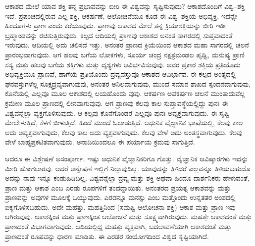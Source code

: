 ಆಕಾಶದ ಮೇಲೆ ಯಾವ ಶಕ್ತಿ ತನ್ನ ಪ್ರಭಾವವನ್ನು ಬೀರಿ ಈ ವಿಶ್ವವನ್ನು ಸೃಷ್ಟಿಸುವುದು? ಆಕಾಶದೊಂದಿಗೆ ವಿಶ್ವ–ಶಕ್ತಿ ಇದೆ. ಪ್ರಪಂಚದಲ್ಲಿರುವ ಎಲ್ಲ ಶಕ್ತಿ, ಆಕರ್ಷಣೆ, ಆಲೋಚನೆಯೂ ಕೂಡ ಈ ವಿಶ್ವ–ಶಕ್ತಿಯ ಅಭಿವ್ಯಕ್ತಿ. ಇದನ್ನೇ ಹಿಂದೂಗಳು ಪ್ರಾಣ ಎಂದು ಕರೆಯುವುದು. ಪ್ರಾಣವು ಆಕಾಶದ ಮೇಲೆ ತನ್ನ ಕ್ರಿಯಾಶಕ್ತಿಯನ್ನು ಬೀರಿ ಇಡೀ ಬ್ರಹ್ಮಾಂಡವನ್ನು ರಚಿಸುತ್ತಿರುವುದು. ಕಲ್ಪದ ಆದಿಯಲ್ಲಿ ಪ್ರಾಣವು ಆಕಾಶದ ಅನಂತ ಸಾಗರದಲ್ಲಿ ಸುಪ್ತವಾದಂತೆ ಇರುವುದು. ಆದಿಯಲ್ಲಿ ಅದು ಚಲಿಸದೆ ಇತ್ತು. ಅನಂತರ ಪ್ರಾಣದ ಕ್ರಿಯೆಯಿಂದ ಆಕಾಶದ ಮಹಾ ಸಾಗರದಲ್ಲಿ ಚಲನೆ ಪ್ರಾರಂಭವಾಗುವುದು. ಆಗ ಹಲವು ಬಗೆಯ ಲೋಕಗಳು, ಸೂರ್ಯ ಚಂದ್ರ ನಕ್ಷತ್ರಮಂಡಲ ಪೃಥ್ವಿ, ಮನುಷ್ಯ ಪ್ರಾಣಿ ಸಸ್ಯ ಮತ್ತು ಹಲವು ಬಗೆಯ ಶಕ್ತಿಗಳು ಮತ್ತು ದೃಶ್ಯಗಳು ಆವಿರ್ಭವಿಸುವುವು. ಅವರ ಪ್ರಕಾರ ಶಕ್ತಿಯ ಪ್ರತಿಯೊದು ಅಭಿವ್ಯಕ್ತಿಯೂ ಪ್ರಾಣವೆ, ಹಾಗೆಯೆ ಪ್ರತಿಯೊಂದು ದ್ರವ್ಯವಸ್ತುವೂ ಆಕಾಶದ ಆವಿರ್ಭಾವ. ಈ ಕಲ್ಪದ ಅಂತ್ಯದಲ್ಲಿ ಘನವಸ್ತುಗಳೆಲ್ಲ ಸೂಕ್ಷ್ಮದ್ರವ್ಯವಾಗುವುವು, ಅನಂತರ ಅನಿಲವಾಗುವುವು, ಮುಂದೆ ಸಮಾನ ಶಾಖದ ಸ್ಪಂದನವಾಗುವುವು, ಕೊನೆಯಲ್ಲಿ ಎಲ್ಲವೂ ಮೂಲ ಆಕಾಶದಲ್ಲಿ ಲಯಹೊಂದು ವುವು. ಆಕರ್ಷಣ ಅಪಕರ್ಷಣ ಚಲನೆ ಮುಂತಾದುವೆಲ್ಲ ಕ್ರಮೇಣ ಮೂಲ ಪ್ರಾಣದಲ್ಲಿ ಲೀನವಾಗುವುವು. ಆಗ ಪ್ರಾಣವು ಕೆಲವು ಕಾಲ ಸುಪ್ತಾವಸ್ಥೆಯಲ್ಲಿದ್ದು ಪುನಃ ಈ ವಿಶ್ವವನ್ನೆಲ್ಲಾ ವ್ಯಕ್ತಗೊಳಿಸುವುದು. ಆ ಕಲ್ಪವು ಕೊನೆಗೊಂಡರೆ ಎಲ್ಲವೂ ಪುನಃ ಅವ್ಯಕ್ತವಾಗುವುದು. ಈ ಸೃಷ್ಟಿ ಮೇಲೇಳುತ್ತಿದೆ, ಕೆಳಗೆ ಬೀಳುತ್ತಿದೆ. ಹಿಂದೆ ಮುಂದೆ ಓಲಾಡುತ್ತಿದೆ. ಆಧುನಿಕ ವೈಜ್ಞಾನಿಕ ಭಾಷೆಯಲ್ಲಿ, ಕೆಲವು ಕಾಲ ಅದು ಅವ್ಯಕ್ತವಾಗುವುದು, ಕೆಲವು ಕಾಲ ಅದು ವ್ಯಕ್ತವಾಗುವುದು. ಕೆಲವು ವೇಳೆ ಅದು ಅಂತಸ್ಥವಾಗುವುದು. ಕೆಲವು ವೇಳೆ ಬಾಹ್ಯಪ್ರಕಟಿತವಾಗುವುದು. ಅನಾದಿಯಿಂದಲೂ ಈ ಪರ್ಯಾಯ ಕ್ರಮವು ಸಾಗುತ್ತಿದೆ.

ಆದರೂ ಈ ವಿಶ್ಲೇಷಣೆ ಅಸಂಪೂರ್ಣ. ಇಷ್ಟು ಆಧುನಿಕ ವೈಜ್ಞಾನಿಕರಿಗೂ ಗೊತ್ತು. ವೈಜ್ಞಾನಿಕ ಆವಿಷ್ಕಾರಗಳು ಇದನ್ನು ಮೀರಿ ಹೋಗಲಾರವು. ಆದರೆ ಅನ್ವೇಷಣೆ ಇಲ್ಲಿಗೆ ನಿಲ್ಲುವುದಿಲ್ಲ. ಯಾವುದನ್ನು ತಿಳಿದರೆ ಎಲ್ಲವನ್ನೂ ತಿಳಿಯಬಹುದೊ ಅದನ್ನು ನಾವು ಇನ್ನೂ ಕಂಡುಹಿಡಿದಿಲ್ಲ. ವಿಶ್ವವನ್ನೆಲ್ಲಾ ದ್ರವ್ಯ ಮತ್ತು ಶಕ್ತಿ ಅಥವಾ ಹಿಂದೂ ದಾರ್ಶನಿಕರು ಹೇಳುವಂತೆ, ಪ್ರಾಣ ಮತ್ತು ಆಕಾಶ ಎಂಬ ಎರಡು ರೂಪಗಳಿಗೆ ತಂದದ್ದಾಯಿತು. ಅನಂತರದ ಪ್ರಯತ್ನ ಆಕಾಶವನ್ನು ಮತ್ತು ಪ್ರಾಣವನ್ನು ಅವುಗಳ ಮೂಲಕ್ಕೆ ಒಯ್ಯುವುದು. ಎರಡನ್ನೂ ಮನಸ್ಸು ಎಂಬ ಮತ್ತೊಂದು ಉನ್ನತತರ ಅಂಶದಲ್ಲಿ ಐಕ್ಯಗೊಳಿಸಬಹುದು. ಅದೇ ಮಹತ್ತು. ಮಹತ್ತಿನಿಂದ (ಸಮಷ್ಟಿ ಆಲೋಚನಾ ಶಕ್ತಿ) ಆಕಾಶ ಮತ್ತು ಪ್ರಾಣ ಇವು ಆಗಿರುವುವು. ಆಕಾಶಕ್ಕಿಂತ ಮತ್ತು ಪ್ರಾಣಕ್ಕಿಂತ ಆಲೋಚನೆ ಮತ್ತು ಸೂಕ್ಷ್ಮವಾಗಿರುವುದು. ಮಹತ್ತೇ ಆಕಾಶದಂತೆ ಮತ್ತು ಪ್ರಾಣದಂತೆ ವಿಭಾಗವಾಗುವುದು. ಆದಿಯಲ್ಲಿದ್ದ ಮಹತ್ತು ವ್ಯಕ್ತವಾಗಿ, ಬದಲಾವಣೆಯಾಗಿ ಆಕಾಶದಂತೆ ಮತ್ತು ಪ್ರಾಣದಂತೆ ರೂಪವನ್ನು ಧಾರಣ ಮಾಡಿತು. ಈ ಎರಡರ ಸಂಯೋಗದಿಂದ ವಿಶ್ವದ ಸೃಷ್ಟಿಯಾಗಿದೆ.

